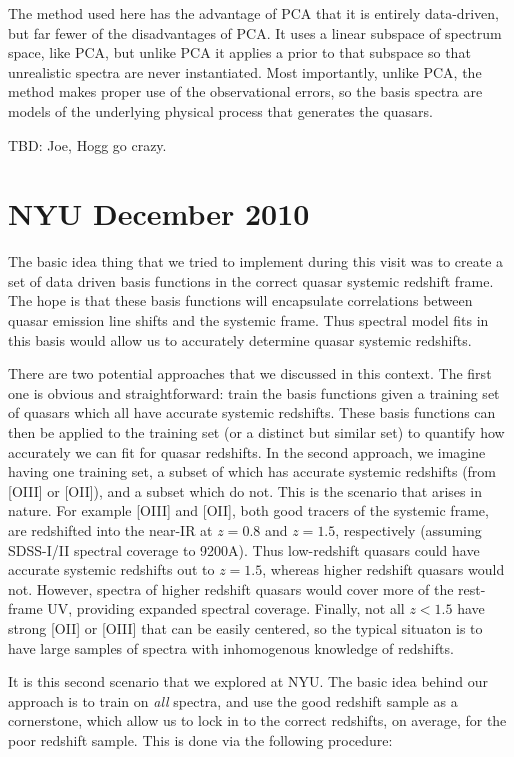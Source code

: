 \documentclass[preprint]{aastex}
\begin{document}
The method used here has the advantage of PCA that it is entirely
data-driven, but far fewer of the disadvantages of PCA.  It uses a
linear subspace of spectrum space, like PCA, but unlike PCA it applies
a prior to that subspace so that unrealistic spectra are never
instantiated.  Most importantly, unlike PCA, the method makes proper
use of the observational errors, so the basis spectra are models of
the underlying physical process that generates the quasars.

TBD:  Joe, Hogg go crazy.

\section{NYU December 2010}

The basic idea thing that we tried to implement during this visit was to create
a set of data driven basis functions in the correct quasar systemic redshift
frame. The hope is that these basis functions will encapsulate correlations
between quasar emission line shifts and the systemic frame. Thus spectral 
model fits in this basis would allow us to accurately determine quasar
systemic redshifts. 

There are two potential approaches that we discussed in this
context. The first one is obvious and straightforward: train the basis
functions given a training set of quasars which all have accurate
systemic redshifts.  These basis functions can then be applied to the
training set (or a distinct but similar set) to quantify how
accurately we can fit for quasar redshifts. In the second approach, we
imagine having one training set, a subset of which has accurate
systemic redshifts (from [OIII] or [OII]), and a subset which do
not. This is the scenario that arises in nature. For example [OIII]
and [OII], both good tracers of the systemic frame, are redshifted into the
near-IR at $z = 0.8$ and $z = 1.5$, respectively (assuming SDSS-I/II
spectral coverage to 9200A). Thus low-redshift quasars could have
accurate systemic redshifts out to $z = 1.5$, whereas higher redshift
quasars would not. However, spectra of higher redshift quasars
would cover more of the rest-frame UV, providing expanded spectral
coverage. Finally, not all $ z < 1.5$ have strong [OII] or [OIII] that
can be easily centered, so the typical situaton is to have large samples
of spectra with inhomogenous knowledge of redshifts. 

It is this second scenario that we explored at NYU. The basic idea
behind our approach is to train on \emph{all} spectra, and use the 
good redshift sample as a cornerstone, which allow us to lock in 
to the correct redshifts, on average, for the poor redshift sample. This is 
done via the following procedure: 
\end{document}
